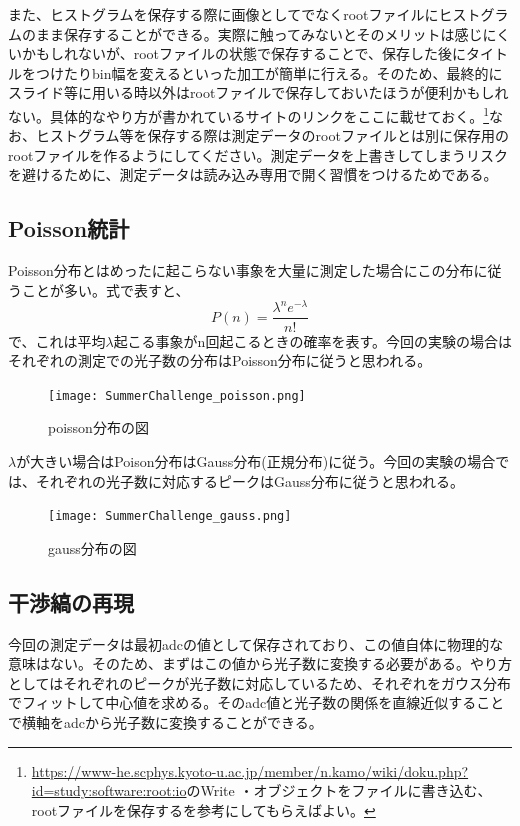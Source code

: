 \documentclass[uplatex,10pt,a4j]{jsarticle}
\begin{document}
また、ヒストグラムを保存する際に画像としてでなくrootファイルにヒストグラムのまま保存することができる。実際に触ってみないとそのメリットは感じにくいかもしれないが、rootファイルの状態で保存することで、保存した後にタイトルをつけたりbin幅を変えるといった加工が簡単に行える。そのため、最終的にスライド等に用いる時以外はrootファイルで保存しておいたほうが便利かもしれない。具体的なやり方が書かれているサイトのリンクをここに載せておく。\footnote{\url{https://www-he.scphys.kyoto-u.ac.jp/member/n.kamo/wiki/doku.php?id=study:software:root:io}のWrite ・オブジェクトをファイルに書き込む、rootファイルを保存するを参考にしてもらえばよい。}なお、ヒストグラム等を保存する際は測定データのrootファイルとは別に保存用のrootファイルを作るようにしてください。測定データを上書きしてしまうリスクを避けるために、測定データは読み込み専用で開く習慣をつけるためである。

\subsection{Poisson統計}
Poisson分布とはめったに起こらない事象を大量に測定した場合にこの分布に従うことが多い。式で表すと、
\begin{equation}
  P\left(n\right)=\frac{\lambda^n e^{-\lambda}}{n!}
\end{equation}
で、これは平均$\lambda$起こる事象がn回起こるときの確率を表す。今回の実験の場合はそれぞれの測定での光子数の分布はPoisson分布に従うと思われる。
\begin{figure}[h]
  \begin{center}
    \texttt{[image: SummerChallenge\_poisson.png]}
    \caption{poisson分布の図}
    \label{fig:poisson}
  \end{center}
\end{figure}

$\lambda$が大きい場合はPoison分布はGauss分布(正規分布)に従う。今回の実験の場合では、それぞれの光子数に対応するピークはGauss分布に従うと思われる。
\begin{figure}[h]
  \begin{center}
    \texttt{[image: SummerChallenge\_gauss.png]}
    \caption{gauss分布の図}
    \label{fig:gauss}
  \end{center}
\end{figure}

\subsection{干渉縞の再現}
今回の測定データは最初adcの値として保存されており、この値自体に物理的な意味はない。そのため、まずはこの値から光子数に変換する必要がある。やり方としてはそれぞれのピークが光子数に対応しているため、それぞれをガウス分布でフィットして中心値を求める。そのadc値と光子数の関係を直線近似することで横軸をadcから光子数に変換することができる。
\end{document}
